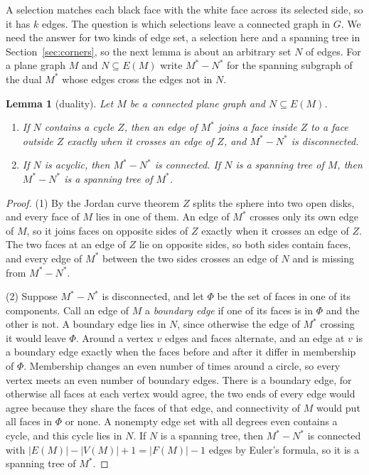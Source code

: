 \documentclass[10pt]{amsart}
\numberwithin{equation}{section}
\newtheorem{lemma}[equation]{Lemma}
\theoremstyle{definition}
\theoremstyle{remark}
\begin{document}
A selection matches each black face with the white face across its selected side, so it has $k$ edges.
The question is which selections leave a connected graph in $G$.
We need the answer for two kinds of edge set, a selection here and a spanning tree in Section~\ref{sec:corners}, so the next lemma is about an arbitrary set $N$ of edges.
For a plane graph $M$ and $N\subseteq E(M)$ write $M^*-N^*$ for the spanning subgraph of the dual $M^*$ whose edges cross the edges not in $N$.

\begin{lemma}[duality]\label{lem:duality}
Let $M$ be a connected plane graph and $N\subseteq E(M)$.
\begin{enumerate}
\item If $N$ contains a cycle $Z$, then an edge of $M^*$ joins a face inside $Z$ to a face outside $Z$ exactly when it crosses an edge of $Z$, and $M^*-N^*$ is disconnected.
\item If $N$ is acyclic, then $M^*-N^*$ is connected. If $N$ is a spanning tree of $M$, then $M^*-N^*$ is a spanning tree of $M^*$.
\end{enumerate}
\end{lemma}

\begin{proof}
(1) By the Jordan curve theorem $Z$ splits the sphere into two open disks, and every face of $M$ lies in one of them.
An edge of $M^*$ crosses only its own edge of $M$, so it joins faces on opposite sides of $Z$ exactly when it crosses an edge of $Z$.
The two faces at an edge of $Z$ lie on opposite sides, so both sides contain faces, and every edge of $M^*$ between the two sides crosses an edge of $N$ and is missing from $M^*-N^*$.

(2) Suppose $M^*-N^*$ is disconnected, and let $\Phi$ be the set of faces in one of its components.
Call an edge of $M$ a \emph{boundary edge} if one of its faces is in $\Phi$ and the other is not.
A boundary edge lies in $N$, since otherwise the edge of $M^*$ crossing it would leave $\Phi$.
Around a vertex $v$ edges and faces alternate, and an edge at $v$ is a boundary edge exactly when the faces before and after it differ in membership of $\Phi$.
Membership changes an even number of times around a circle, so every vertex meets an even number of boundary edges.
There is a boundary edge, for otherwise all faces at each vertex would agree, the two ends of every edge would agree because they share the faces of that edge, and connectivity of $M$ would put all faces in $\Phi$ or none.
A nonempty edge set with all degrees even contains a cycle, and this cycle lies in $N$.
If $N$ is a spanning tree, then $M^*-N^*$ is connected with $|E(M)|-|V(M)|+1=|F(M)|-1$ edges by Euler's formula, so it is a spanning tree of $M^*$.
\end{proof}
\end{document}
